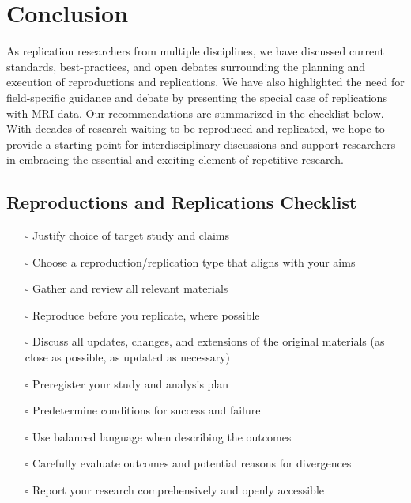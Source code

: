 \documentclass[
  letterpaper,
  DIV=11,
  openany,
  fontsize=12pt,
  parskip=half,
  headings=big,
  numbers=noenddot,
  titlepage=false]{scrreprt}
\providecommand{\tightlist}{%
  \setlength{\itemsep}{0pt}\setlength{\parskip}{0pt}}
\begin{document}
\chapter{Conclusion}\label{conclusion}

As replication researchers from multiple disciplines, we have discussed
current standards, best-practices, and open debates surrounding the
planning and execution of reproductions and replications. We have also
highlighted the need for field-specific guidance and debate by
presenting the special case of replications with MRI data. Our
recommendations are summarized in the checklist below. With decades of
research waiting to be reproduced and replicated, we hope to provide a
starting point for interdisciplinary discussions and support researchers
in embracing the essential and exciting element of repetitive research.

\section{Reproductions and Replications
Checklist}\label{reproductions-and-replications-checklist}

\begin{itemize}
\tightlist
\item[$\square$]
  Justify choice of target study and claims\\
\item[$\square$]
  Choose a reproduction/replication type that aligns with your aims\\
\item[$\square$]
  Gather and review all relevant materials\\
\item[$\square$]
  Reproduce before you replicate, where possible\\
\item[$\square$]
  Discuss all updates, changes, and extensions of the original materials
  (as close as possible, as updated as necessary)\\
\item[$\square$]
  Preregister your study and analysis plan\\
\item[$\square$]
  Predetermine conditions for success and failure\\
\item[$\square$]
  Use balanced language when describing the outcomes\\
\item[$\square$]
  Carefully evaluate outcomes and potential reasons for divergences\\
\item[$\square$]
  Report your research comprehensively and openly accessible
\end{itemize}
\end{document}

